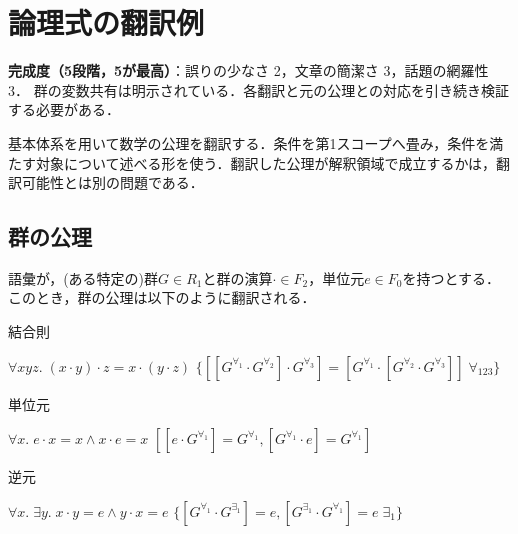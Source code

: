 \documentclass[../../main-detail.tex]{subfiles}
\begin{document}
\section{論理式の翻訳例}
\begin{leftwavybox}
\textbf{完成度（5段階，5が最高）}：誤りの少なさ 2，文章の簡潔さ 3，話題の網羅性 3．
群の変数共有は明示されている．各翻訳と元の公理との対応を引き続き検証する必要がある．
\end{leftwavybox}
基本体系を用いて数学の公理を翻訳する．条件を第1スコープへ畳み，条件を満たす対象について述べる形を使う．翻訳した公理が解釈領域で成立するかは，翻訳可能性とは別の問題である．
\subsection{群の公理}
語彙が，(ある特定の)群$G \in R_1$と群の演算$\cdot \in F_2$，単位元$e\in F_0$を持つとする．このとき，群の公理は以下のように翻訳される．
\begin{exe}
    \ex 結合則
    \begin{xlist}
        \ex $\forall xyz.\; (x\cdot y)\cdot z = x \cdot (y \cdot z)$
        \ex $\{[[G^{\forall_1} \cdot G^{\forall_2}] \cdot G^{\forall_3}] = [G^{\forall_1} \cdot [G^{\forall_2} \cdot G^{\forall_3}]]\; \forall_{123}\}$
    \end{xlist}
    \ex 単位元
    \begin{xlist}
        \ex $\forall x.\; e \cdot x = x \land x \cdot e = x$
        \ex $[[e \cdot G^{\forall_1}] = G^{\forall_1}\mathbin{,} [G^{\forall_1} \cdot e] = G^{\forall_1}]$
    \end{xlist}
    \ex 逆元
    \begin{xlist}
        \ex $\forall x.\; \exists y.\; x \cdot y = e \land y \cdot x = e$
        \ex $\{[G^{\forall_1} \cdot G^{\exists_1}] = e\mathbin{,} [G^{\exists_1} \cdot G^{\forall_1}] = e\; \exists_1\}$
    \end{xlist}
\end{exe}
\end{document}
